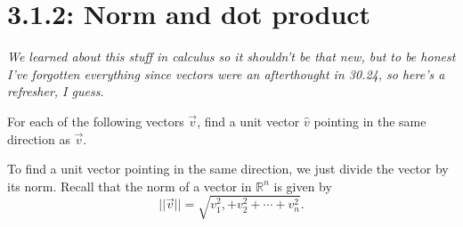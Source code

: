 \documentclass{article}
\begin{document}
\section*{3.1.2: Norm and dot product}
\textit{We learned about this stuff in calculus so it shouldn't be that new, but to be honest I've forgotten everything since vectors were an afterthought in 30.24, so here's a refresher, I guess.}
\begin{center}
    \colorbox{CornflowerBlue!50}{
    \begin{minipage}[c]{0.9\textwidth}
        \centering
        For each of the following vectors \(\overrightarrow{v}\), find a unit vector \(\hat{v}\) pointing in the same direction as \(\overrightarrow{v}\). 
    \end{minipage}
    }
\end{center}
To find a unit vector pointing in the same direction, we just divide the vector by its norm. Recall that the norm of a vector in \(\mathbb{R}^n\) is given by \[
    \big|\!\big|\overrightarrow{v}\big|\!\big| = \sqrt{v_1^2,+ v_2^2 + \cdots + v_n^2}. 
\]
\end{document}
